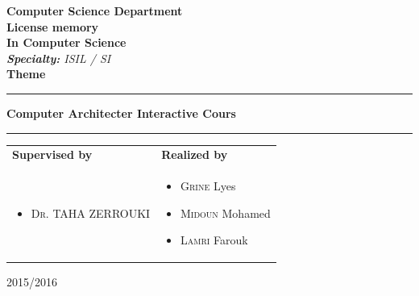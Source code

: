 \begin{titlepage}
\begin{center}
{ \textbf{Computer Science Department}}\\ \vspace{0.8cm}
\Huge{\textbf{License memory}} \\ \Large{\textbf{In Computer Science}} \\\vspace{0.3cm}
\large{\emph{\textbf{Specialty: } ISIL / SI}}\\ \vspace{0.8cm}
\huge{\textbf{Theme}}\\ %
\noindent\rule{\textwidth}{1mm}
\Large{\textbf{Computer Architecter Interactive Cours}}
\noindent\rule{\textwidth}{1mm}
\end{center}
\vspace{0.3cm}
\begin{tabular}{ p{9cm}  p{6cm} }
\textbf{Supervised by} & \textbf{Realized by} \\
\begin{itemize}
	\item \textsc{Dr.} TAHA ZERROUKI
\end{itemize}
&
\begin{itemize}
	\item \textsc{Grine} Lyes
	\item \textsc{Midoun} Mohamed
  \item \textsc{Lamri} Farouk
\end{itemize}
\\
\end{tabular}
\vspace{4.5cm}
\begin{center}
2015/2016
\end{center}

\end{titlepage}